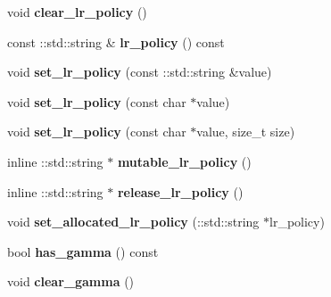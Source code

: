 \begin{DoxyCompactItemize}
void {\bfseries clear\+\_\+lr\+\_\+policy} ()
\item 
\mbox{\label{classcaffe_1_1_solver_parameter_a1db8b2d9b7d73aad88a204419be4f04f}} 
const \+::std\+::string \& {\bfseries lr\+\_\+policy} () const
\item 
\mbox{\label{classcaffe_1_1_solver_parameter_ab7ef93dfffa8945dde25e5419a14d69e}} 
void {\bfseries set\+\_\+lr\+\_\+policy} (const \+::std\+::string \&value)
\item 
\mbox{\label{classcaffe_1_1_solver_parameter_a40b59f774f9f2db9943d16a42495daf4}} 
void {\bfseries set\+\_\+lr\+\_\+policy} (const char $\ast$value)
\item 
\mbox{\label{classcaffe_1_1_solver_parameter_a47ee18ad7c851d575c8f88b2693f9e3f}} 
void {\bfseries set\+\_\+lr\+\_\+policy} (const char $\ast$value, size\+\_\+t size)
\item 
\mbox{\label{classcaffe_1_1_solver_parameter_a8df1e782a79f6c363a88e62a9e214796}} 
inline \+::std\+::string $\ast$ {\bfseries mutable\+\_\+lr\+\_\+policy} ()
\item 
\mbox{\label{classcaffe_1_1_solver_parameter_a6991841e14721358096ade59c8a46d46}} 
inline \+::std\+::string $\ast$ {\bfseries release\+\_\+lr\+\_\+policy} ()
\item 
\mbox{\label{classcaffe_1_1_solver_parameter_a5b899b9f7a3514d6c4aebbb678e36d8d}} 
void {\bfseries set\+\_\+allocated\+\_\+lr\+\_\+policy} (\+::std\+::string $\ast$lr\+\_\+policy)
\item 
\mbox{\label{classcaffe_1_1_solver_parameter_a9b680ec06735bc6157f47e68ad167de1}} 
bool {\bfseries has\+\_\+gamma} () const
\item 
\mbox{\label{classcaffe_1_1_solver_parameter_ae814b3413a06cd11f11e536688a528aa}} 
void {\bfseries clear\+\_\+gamma} ()
\item 
\mbox{\label{classcaffe_1_1_solver_parameter_adb65644979e3b88ba101294ec9278022}} 

\end{DoxyCompactItemize}
